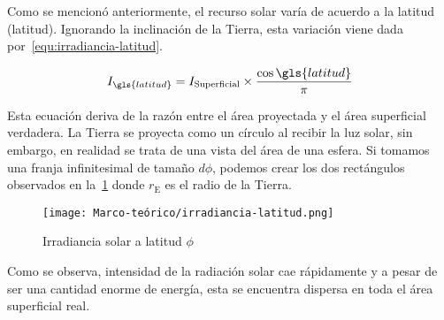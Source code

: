 			Como se mencionó anteriormente, el recurso solar varía de acuerdo a la latitud (\gls{latitud}). Ignorando la inclinación de la Tierra, esta variación viene dada por~\eqref{equ:irradiancia-latitud}.
			
			\begin{equation}
				\label{equ:irradiancia-latitud}
				I_{\gls{latitud}} = I_{\text{Superficial}} \times \dfrac{\cos{\gls{latitud}}}{\pi}
			\end{equation}
			
			Esta ecuación deriva de la razón entre el área proyectada y el área superficial verdadera. La Tierra se proyecta como un círculo al recibir la luz solar, sin embargo, en realidad se trata de una vista del área de una esfera. Si tomamos una franja infinitesimal de tamaño $d\phi$, podemos crear los dos rectángulos observados en la~\cref{fig:irradiancia-latitud} donde $r_{\text{E}} $ es el radio de la Tierra.
			
			\begin{figure}
				\centering
				\texttt{[image: Marco-teórico/irradiancia-latitud.png]}
				\caption{Irradiancia solar a latitud $\phi$}
				\label{fig:irradiancia-latitud}
			\end{figure}
			
			Como se observa, intensidad de la radiación solar cae rápidamente y a pesar de ser una cantidad enorme de energía, esta se encuentra dispersa en toda el área superficial real.
		
		
		
		
	
		
		
		